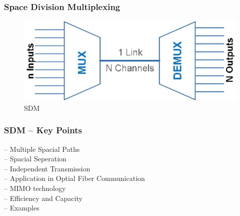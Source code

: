 \documentclass{beamer}
\begin{document}
\begin{frame}
\frametitle{Space Division Multiplexing}
\begin{figure}
	\includegraphics[scale = 0.5]{figs/sdm.jpg}
	\caption{SDM}
\end{figure}
\end{frame}

\begin{frame}
\frametitle{SDM -- Key Points}
-- Multiple Spacial Paths \\
-- Spacial Seperation \\
-- Independent Transmission \\
-- Application in Optial Fiber Communication \\
-- MIMO technology \\
-- Efficiency and Capacity \\
-- Examples \\
\end{frame}
\end{document}
